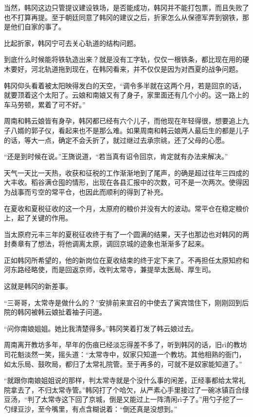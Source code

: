 当然，韩冈这边只管提议建设铁场，是否能成功，韩冈并不能打包票，而且失败了也不打算再提。至于朝廷同意了韩冈的建议之后，折家怎么从保德军弄到钢铁，那是他们自家的事了。

比起折家，韩冈宁可去关心轨道的结构问题。

到底什么时候能将铁轨造出来？就是没有工字轨，仅仅一根铁条，都比现在用的硬木要好，河北轨道拖到现在，在韩冈看来，并不仅仅是因为对西夏的战争问题。

韩冈仰头看着被太阳映得发白的天空，“调令多半就在这两个月，若是回京的话，就要顶着这个太阳了。云娘和南娘又有了身子，家里面还有几个小的。这一路上的车马劳顿，累着了可不好。”

周南和韩云娘皆有身孕，韩冈都已经有六个儿子，而他现在年轻得很，想要追上九子八婿的郭子仪，看起来也不是那么难。如果周南和韩云娘两人最后生的都是儿子的话，等大一点，确定不会夭折了，就过继过去承宗祧，还了父母的心愿。

“还是到时候在说。”王旖说道，“若当真有诏令回京，肯定就有办法来解决。”

天气一天比一天热，收获和征税的工作渐渐地到了尾声，的确是超过往年三四成的大丰收。稻谷满仓囤的情形，出现在各县汇报中的次数，可不是一次两次。使得因为战事而亏空的常平仓，也因此而顺利的得到了补充。

在夏收和夏税征收的这一个月，太原府的粮价并没有大的波动。常平仓在稳定粮价上，起了关键的作用。

当太原府元丰三年的夏税征收终于有了一个圆满的结果，天子也那边也对韩冈的两封奏章有了想法，将他调离太原，调回京城的迹象也渐渐多了起来。

正如韩冈所希望的，他的新岗位在夏收结束的终于定下来了。不再担任太原知府和河东路经略使，而是回返京师，改判太常寺，兼提举太医局、厚生司。

这就是韩冈的新差事。

“三哥哥，太常寺是做什么的？”安排前来宣召的中使去了寅宾馆住下，刚刚回到后院的韩冈被韩云娘扯着袖子问道。

“问你南娘姐姐。她比我清楚得多。”韩冈笑着打发了韩云娘过去。

周南离开教坊多年，早年的伤痕已经淡忘得差不多了，听到韩冈的话，旧rì的教坊司花魁淡然一笑，摇头道：“太常寺中，奴家只知道一个教坊。其他相熟的衙门，如太乐局、鼓吹局，都归了太常礼院管。至于再多的，可就不是奴家能知道了。”

“就跟你南娘姐姐说的那样，判太常寺就是个没什么事的闲差，正经事都给太常礼院拿去了，不归太常寺管。”韩冈打了个哈欠，从严素心手里接过了一碗冰镇百合绿豆汤，“判了太常寺这下回了京城，倒是又能过上一阵清闲rì子了。”用勺子挖了一勺绿豆沙，至今嘴里，有点含糊说着：“倒还真是没想到。”

